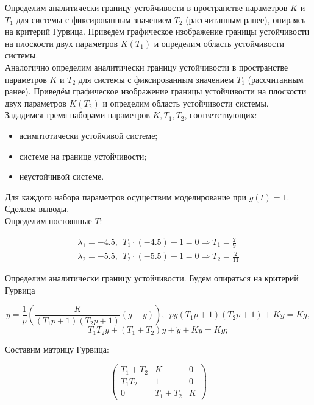 Определим аналитически границу устойчивости в пространстве параметров $K$ и $T_1$ для системы с фиксированным значением $T_2$ (рассчитанным ранее), опираясь на критерий Гурвица. Приведём графическое изображение границы устойчивости на плоскости двух параметров $K(T_1)$ и определим область устойчивости системы. \\
Аналогично определим аналитически границу устойчивости в пространстве параметров $K$ и $T_2$ для системы с фиксированным значением $T_1$ (рассчитанным ранее). Приведём графическое изображение границы устойчивости на плоскости двух параметров $K(T_2)$ и определим область устойчивости системы. \\
Зададимся тремя наборами параметров $K, T_1, T_2$, соответствующих:
\begin{itemize}
\item асимптотически устойчивой системе;
\item системе на границе устойчивости;
\item неустойчивой системе.
\end{itemize}
Для каждого набора параметров осуществим моделирование при $g(t) = 1$. \\
Сделаем выводы.
\\


Определим постоянные $T$:


\begin{par}
$$\begin{array}{l}
\lambda_1 =-4.5,~~T_1 \cdot (-4.5)+1=0\Rightarrow T_1 =\frac{2}{9}\\
\lambda_2 =-5.5,~~T_2 \cdot (-5.5)+1=0\Rightarrow T_2 =\frac{2}{11}
\end{array}$$
\end{par}

Определим аналитически границу устойчивости. Будем опираться на критерий Гурвица

$$
y=\frac{1}{p}\left(\frac{K}{(T_1 p+1)(T_2 p+1)}(g-y)\right),~~py(T_1 p+1)(T_2 p+1)+Ky=Kg,
$$
$$
T_1 T_2 \dddot{y} +(T_1 +T_2 )\ddot{y} +\dot{y} +Ky=Kg;
$$

Составим матрицу Гурвица:

\begin{par}
$$\left(\begin{array}{ccc}
T_1 +T_2  & K & 0\\
T_1 T_2  & 1 & 0\\
0 & T_1 +T_2  & K
\end{array}\right)$$
\end{par}

